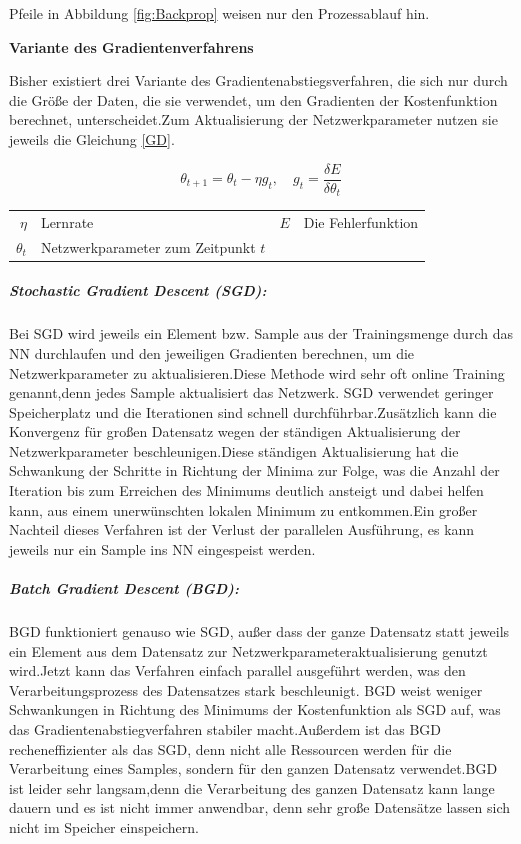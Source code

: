 \documentclass[12pt,a4paper]{scrartcl}
\numberwithin{equation}{section}
\begin{document}
Pfeile in Abbildung \ref{fig:Backprop} weisen nur den Prozessablauf hin.







\begin{center}
	\textbf{Variante des Gradientenverfahrens}
\end{center}
Bisher existiert drei Variante des Gradientenabstiegsverfahren, die sich nur durch die Größe der Daten, die sie verwendet, um den Gradienten der Kostenfunktion berechnet, unterscheidet.Zum Aktualisierung der Netzwerkparameter nutzen sie jeweils die Gleichung \eqref{GD}.

\begin{equation}\label{GD}
\theta_{t+1} = \theta_{t} -\eta g_{t}, \quad g_t=\frac{\delta E}{\delta \theta_{t}}
\end{equation}
\begin{center}
	\begin{tabular}{r@{: }l r@{: }l}
		$ \eta$& Lernrate & $ E$ & Die Fehlerfunktion\\
		$ \theta_{t} $& Netzwerkparameter zum Zeitpunkt $ t $
	\end{tabular}
\end{center}
\subparagraph{Stochastic Gradient Descent (SGD):}
Bei SGD wird jeweils ein Element bzw. Sample aus der Trainingsmenge durch das \ac{NN} durchlaufen und den jeweiligen Gradienten berechnen, um die Netzwerkparameter zu aktualisieren.Diese Methode wird sehr oft online Training  genannt,denn jedes Sample aktualisiert das Netzwerk. SGD verwendet geringer Speicherplatz und die Iterationen sind schnell durchführbar.Zusätzlich kann die Konvergenz für großen Datensatz wegen der ständigen Aktualisierung der Netzwerkparameter beschleunigen.Diese ständigen Aktualisierung hat die Schwankung der Schritte in Richtung der Minima zur Folge, was die Anzahl der Iteration bis zum Erreichen des Minimums deutlich ansteigt und dabei helfen kann, aus einem unerwünschten lokalen Minimum zu entkommen.Ein großer Nachteil dieses Verfahren ist der Verlust der parallelen Ausführung, es kann jeweils nur ein Sample ins \ac{NN} eingespeist werden.
\subparagraph{Batch Gradient Descent (BGD):}
BGD funktioniert genauso wie SGD, außer dass der ganze Datensatz statt jeweils ein Element aus dem Datensatz zur Netzwerkparameteraktualisierung genutzt wird.Jetzt kann das Verfahren einfach parallel ausgeführt werden, was den Verarbeitungsprozess des Datensatzes stark beschleunigt. BGD weist weniger Schwankungen in Richtung des Minimums der Kostenfunktion als SGD auf, was das Gradientenabstiegverfahren stabiler macht.Außerdem ist das BGD recheneffizienter als das SGD, denn nicht alle Ressourcen werden für die Verarbeitung eines Samples, sondern für den ganzen Datensatz verwendet.BGD ist leider sehr langsam,denn die Verarbeitung des ganzen Datensatz kann lange dauern und es ist nicht immer anwendbar, denn sehr große Datensätze lassen sich nicht im Speicher einspeichern.
\end{document}
